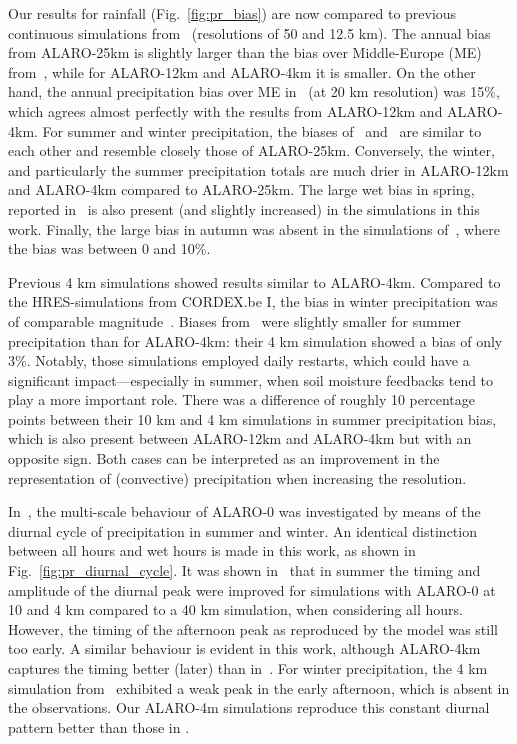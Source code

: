 \documentclass[journal abbreviation, manuscript]{copernicus}
\begin{document}
Our results for rainfall (Fig.~\ref{fig:pr_bias}) are now compared to previous continuous simulations from~\citet{giot_validation_2016} (resolutions of 50 and 12.5 km).
The annual bias from ALARO-25km is slightly larger than the bias over Middle-Europe (ME) from~\citet{giot_validation_2016}, while for ALARO-12km and ALARO-4km it is smaller.
On the other hand, the annual precipitation bias over ME in~\citet{berckmans_reinitialised_2017} (at 20 km resolution) was 15$\%$, which agrees almost perfectly with the results from ALARO-12km and ALARO-4km. 
For summer and winter precipitation, the biases of~\citet{berckmans_reinitialised_2017} and~\citet{giot_validation_2016} are similar to each other and resemble closely those of ALARO-25km. 
Conversely, the winter, and particularly the summer precipitation totals are much drier in ALARO-12km and ALARO-4km compared to ALARO-25km.
The large wet bias in spring, reported in~\citet{giot_validation_2016} is also present (and slightly increased) in the simulations in this work.
Finally, the large bias in autumn was absent in the simulations of~\citet{giot_validation_2016}, where the bias was between 0 and 10$\%$.

Previous 4 km simulations showed results similar to ALARO-4km.
Compared to the HRES-simulations from CORDEX.be I, the bias in winter precipitation was of comparable magnitude~\citep{termonia_combining_2018}.
Biases from~\citet{de_troch_multiscale_2013} were slightly smaller for summer precipitation than for ALARO-4km: their 4 km simulation showed a bias of only 3\%.
Notably, those simulations employed daily restarts, which could have a significant impact—especially in summer, when soil moisture feedbacks tend to play a more important role.
There was a difference of roughly 10 percentage points between their 10 km and 4 km simulations in summer precipitation bias, which is also present between ALARO-12km and ALARO-4km but with an opposite sign. 
Both cases can be interpreted as an improvement in the representation of (convective) precipitation when increasing the resolution. 

In~\citet{de_troch_application_2016}, the multi-scale behaviour of ALARO-0 was investigated by means of the diurnal cycle of precipitation in summer and winter.
An identical distinction between all hours and wet hours is made in this work, as shown in Fig.~\ref{fig:pr_diurnal_cycle}. 
It was shown in~\citet{de_troch_application_2016} that in summer the timing and amplitude of the diurnal peak were improved for simulations with ALARO-0 at 10 and 4 km compared to a 40 km simulation, when considering all hours. 
However, the timing of the afternoon peak as reproduced by the model was still too early. 
A similar behaviour is evident in this work, although ALARO-4km captures the timing better (later) than in~\citet{de_troch_application_2016}.
For winter precipitation, the 4 km simulation from~\citet{de_troch_application_2016} exhibited a weak peak in the early afternoon, which is absent in the observations. 
Our ALARO-4m simulations reproduce this constant diurnal pattern better than those in \citet{de_troch_application_2016}.
\end{document}
